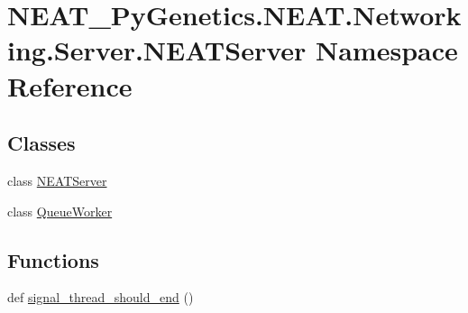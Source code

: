 \hypertarget{namespaceNEAT__PyGenetics_1_1NEAT_1_1Networking_1_1Server_1_1NEATServer}{}\section{N\+E\+A\+T\+\_\+\+Py\+Genetics.\+N\+E\+A\+T.\+Networking.\+Server.\+N\+E\+A\+T\+Server Namespace Reference}
\label{namespaceNEAT__PyGenetics_1_1NEAT_1_1Networking_1_1Server_1_1NEATServer}
\subsection*{Classes}
\begin{DoxyCompactItemize}
\item 
class \hyperlink{classNEAT__PyGenetics_1_1NEAT_1_1Networking_1_1Server_1_1NEATServer_1_1NEATServer}{N\+E\+A\+T\+Server}
\item 
class \hyperlink{classNEAT__PyGenetics_1_1NEAT_1_1Networking_1_1Server_1_1NEATServer_1_1QueueWorker}{Queue\+Worker}
\end{DoxyCompactItemize}
\subsection*{Functions}
\begin{DoxyCompactItemize}
\item 
def \hyperlink{namespaceNEAT__PyGenetics_1_1NEAT_1_1Networking_1_1Server_1_1NEATServer_a7f23754a67df20fada4b79bc4061da68}{signal\+\_\+thread\+\_\+should\+\_\+end} ()
\end{DoxyCompactItemize}
